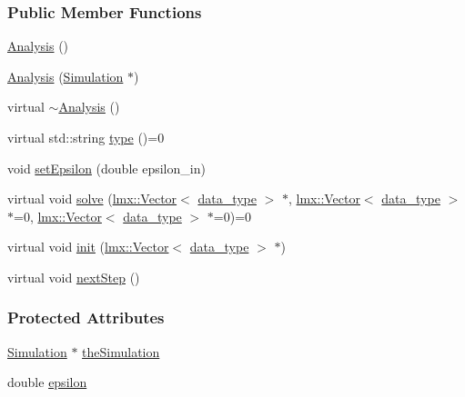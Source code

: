 \subsubsection*{Public Member Functions}
\begin{DoxyCompactItemize}
\item 
\hyperlink{classmknix_1_1_analysis_a524d9cd12f302975c64a0c4266cd91ed}{Analysis} ()
\item 
\hyperlink{classmknix_1_1_analysis_a58f5b79c2b28457ae18186991306abb3}{Analysis} (\hyperlink{classmknix_1_1_simulation}{Simulation} $\ast$)
\item 
virtual \hyperlink{classmknix_1_1_analysis_a4813618a04dd0c3098a58b60792f2e34}{$\sim$\+Analysis} ()
\item 
virtual std\+::string \hyperlink{classmknix_1_1_analysis_a6dd7026a22ae11f3eef3dad3be370e70}{type} ()=0
\item 
void \hyperlink{classmknix_1_1_analysis_a4e6baab7f63725b4ed816bb3bdbdc1d8}{set\+Epsilon} (double epsilon\+\_\+in)
\item 
virtual void \hyperlink{classmknix_1_1_analysis_a515bc01fa8704395d310c5e7ebd45081}{solve} (\hyperlink{classlmx_1_1_vector}{lmx\+::\+Vector}$<$ \hyperlink{namespacemknix_a16be4b246fbf2cceb141e3a179111020}{data\+\_\+type} $>$ $\ast$, \hyperlink{classlmx_1_1_vector}{lmx\+::\+Vector}$<$ \hyperlink{namespacemknix_a16be4b246fbf2cceb141e3a179111020}{data\+\_\+type} $>$ $\ast$=0, \hyperlink{classlmx_1_1_vector}{lmx\+::\+Vector}$<$ \hyperlink{namespacemknix_a16be4b246fbf2cceb141e3a179111020}{data\+\_\+type} $>$ $\ast$=0)=0
\item 
virtual void \hyperlink{classmknix_1_1_analysis_af9e3f13a8644466d416c7666a93c21ca}{init} (\hyperlink{classlmx_1_1_vector}{lmx\+::\+Vector}$<$ \hyperlink{namespacemknix_a16be4b246fbf2cceb141e3a179111020}{data\+\_\+type} $>$ $\ast$)
\item 
virtual void \hyperlink{classmknix_1_1_analysis_a238dc1446726315d1d988c2b8eeda8e5}{next\+Step} ()
\end{DoxyCompactItemize}
\subsubsection*{Protected Attributes}
\begin{DoxyCompactItemize}
\item 
\hyperlink{classmknix_1_1_simulation}{Simulation} $\ast$ \hyperlink{classmknix_1_1_analysis_a1abc29e3b8565590b6bf0ce2d8b3b68f}{the\+Simulation}
\item 
double \hyperlink{classmknix_1_1_analysis_a7e0439caf5fa5f90d808acec6d75b72f}{epsilon}
\end{DoxyCompactItemize}


